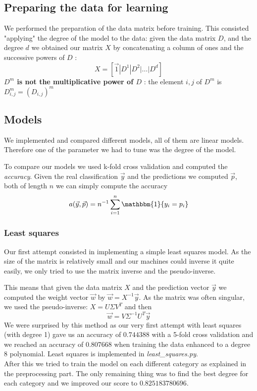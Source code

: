 \documentclass[10pt,conference,compsocconf]{IEEEtran}
\begin{document}
\subsection{Preparing the data for learning}
We performed the preparation of the data matrix before training. This consisted "applying" the degree of the model to the data: given the data matrix $D$, and the degree $d$ we obtained our matrix $X$ by concatenating a column of ones and the successive powers of $D$ : $$X = \left[\vec{1} | D^1 | D^2 | \dots | D^d\right]$$
\textbf{$D^m$ is not the multiplicative power of $D$ }: the element $i,j$ of $D^m$ is $D^m_{i,j}= (D_{i,j})^m$

\subsection{Models}
We implemented and compared different models, all of them are linear models. Therefore one of the parameter we had to tune was the degree of the model.

To compare our models we used k-fold cross validation and computed the \textit{accuracy}. Given the real classification $\vec{y}$ and the predictions we computed $\vec{p}$, both of length $n$ we can simply compute the accuracy $$a(\vec{y}, \vec{p}) = n^{-1}\sum_{i=1}^n \mathbbm{1}\{y_i = p_i\}$$

\subsubsection{Least squares}
Our first attempt consisted in implementing a simple least squares model. As the size of the matrix is relatively small and our machines could inverse it quite easily, we only tried to use the matrix inverse and the pseudo-inverse.

This means that given the data matrix $X$ and the prediction vector $\vec{y}$ we computed the weight vector $\vec{w}$ by
$\vec{w} = X^{-1} \vec{y}$. As the matrix was often singular, we used the pseudo-inverse: $X = U \Sigma V^T$ and then
$$\vec{w} = V \Sigma^{-1} U^T \vec{y}$$
We were surprised by this method as our very first attempt with least squares (with degree 1) gave us an accuracy of $0.744388$ with a 5-fold cross validation and we reached an accuracy of $0.807668$ when training the data enhanced to a degree 8 polynomial.
Least squares is implemented in \textit{least\_squares.py}.\\
After this we tried to train the model on each different category as explained in the preprocessing part. The only remaining thing was to find the best degree for each category and we improved our score to $0.825183780696$.
\end{document}
